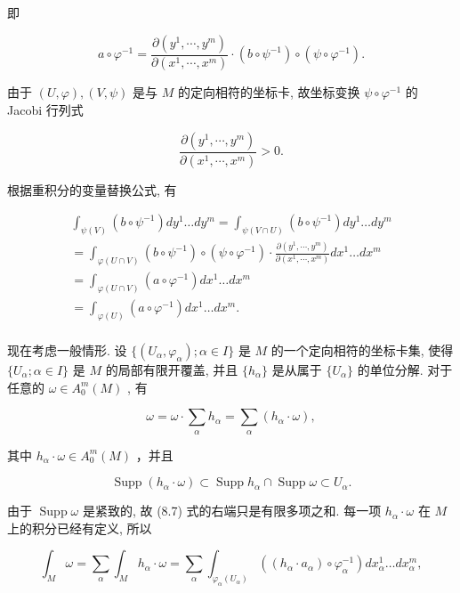 即

$$
a \circ \varphi^ {- 1} = \frac {\partial \left(y ^ {1} , \cdots , y ^ {m}\right)}{\partial \left(x ^ {1} , \cdots , x ^ {m}\right)} \cdot (b \circ \psi^ {- 1}) \circ (\psi \circ \varphi^ {- 1}). %
$$

由于  $(U, \varphi), (V, \psi)$  是与  $M$  的定向相符的坐标卡, 故坐标变换  $\psi \circ \varphi^{-1}$  的 Jacobi 行列式

$$
\frac {\partial \left(y ^ {1} , \cdots , y ^ {m}\right)}{\partial \left(x ^ {1} , \cdots , x ^ {m}\right)} > 0. %
$$

根据重积分的变量替换公式, 有

$$
\begin{array}{l} \int_ {\psi (V)} \left(b \circ \psi^ {- 1}\right) d y ^ {1} \dots d y ^ {m} = \int_ {\psi (V \cap U)} \left(b \circ \psi^ {- 1}\right) d y ^ {1} \dots d y ^ {m} \\ = \int_ {\varphi (U \cap V)} \left(b \circ \psi^ {- 1}\right) \circ \left(\psi \circ \varphi^ {- 1}\right) \cdot \frac {\partial \left(y ^ {1} , \cdots , y ^ {m}\right)}{\partial \left(x ^ {1} , \cdots , x ^ {m}\right)} d x ^ {1} \dots d x ^ {m} \\ = \int_ {\varphi (U \cap V)} \left(a \circ \varphi^ {- 1}\right) d x ^ {1} \dots d x ^ {m} \\ = \int_ {\varphi (U)} \left(a \circ \varphi^ {- 1}\right) d x ^ {1} \dots d x ^ {m}. %
 \\ \end{array}
$$

现在考虑一般情形. 设  $\{(U_{\alpha}, \varphi_{\alpha}); \alpha \in I\}$  是  $M$  的一个定向相符的坐标卡集, 使得  $\{U_{\alpha}; \alpha \in I\}$  是  $M$  的局部有限开覆盖, 并且  $\{h_{\alpha}\}$  是从属于  $\{U_{\alpha}\}$  的单位分解. 对于任意的  $\omega \in A_0^m(M)$ , 有

$$
\omega = \omega \cdot \sum_ {\alpha} h _ {\alpha} = \sum_ {\alpha} \left(h _ {\alpha} \cdot \omega\right), %
$$

其中  $h_\alpha \cdot \omega \in A_0^m (M)$  ，并且

$$
\operatorname {S u p p} \left(h _ {\alpha} \cdot \omega\right) \subset \operatorname {S u p p} h _ {\alpha} \cap \operatorname {S u p p} \omega \subset U _ {\alpha}.
$$

由于  $\operatorname{Supp}\omega$  是紧致的, 故 (8.7) 式的右端只是有限多项之和. 每一项  $h_{\alpha} \cdot \omega$  在  $M$  上的积分已经有定义, 所以

$$
\int_ {M} \omega = \sum_ {\alpha} \int_ {M} h _ {\alpha} \cdot \omega = \sum_ {\alpha} \int_ {\varphi_ {\alpha} (U _ {\alpha})} ((h _ {\alpha} \cdot a _ {\alpha}) \circ \varphi_ {\alpha} ^ {- 1}) d x _ {\alpha} ^ {1} \dots d x _ {\alpha} ^ {m}, %
$$

